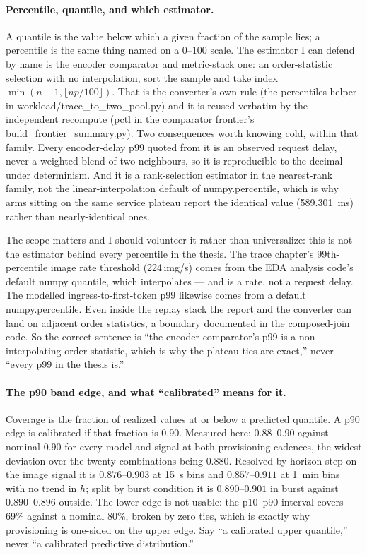 \documentclass[11pt,a4paper]{article}
\def\emph#1{#1}\def\texttt#1{#1}%
\begin{document}
\paragraph{Percentile, quantile, and which estimator.} A quantile is the
value below which a given fraction of the sample lies; a percentile is the
same thing named on a 0--100 scale. The estimator I can defend by name is the
\emph{encoder comparator and metric-stack} one: an \emph{order-statistic
selection with no interpolation}, sort the sample and take index
$\min(n-1, \lfloor n p/100 \rfloor)$. That is the converter's own rule (the
\texttt{percentiles} helper in \texttt{workload/trace\_to\_two\_pool.py}) and
it is reused verbatim by the independent recompute (\texttt{pctl} in the
comparator frontier's \texttt{build\_frontier\_summary.py}). Two consequences
worth knowing cold, \emph{within that family}. Every encoder-delay p99 quoted
from it is an \emph{observed} request delay, never a weighted blend of two
neighbours, so it is reproducible to the decimal under determinism. And it is
a rank-selection estimator in the nearest-rank family, not the
linear-interpolation default of \texttt{numpy.percentile}, which is why arms
sitting on the same service plateau report the \emph{identical} value
(\SI{589.301}{\milli\second}) rather than nearly-identical ones.

The scope matters and I should volunteer it rather than universalize: this is
\emph{not} the estimator behind every percentile in the thesis. The trace
chapter's 99th-percentile image \emph{rate} threshold
(\num{224}\,\si{img/s}) comes from the EDA analysis code's default
\texttt{numpy} quantile, which interpolates --- and is a rate, not a request
delay. The modelled ingress-to-first-token p99 likewise comes from a default
\texttt{numpy.percentile}. Even inside the replay stack the report and the
converter can land on adjacent order statistics, a boundary documented in the
composed-join code. So the correct sentence is ``the encoder comparator's p99
is a non-interpolating order statistic, which is why the plateau ties are
exact,'' never ``every p99 in the thesis is.''

\paragraph{The p90 band edge, and what ``calibrated'' means for it.}
Coverage is the fraction of realized values at or below a predicted
quantile. A p90 edge is calibrated if that fraction is $0.90$. Measured here:
$0.88$--$0.90$ against nominal $0.90$ for every model and signal at both
provisioning cadences, the widest deviation over the twenty combinations
being $0.880$. Resolved by horizon step on the image signal it is
$0.876$--$0.903$ at \SI{15}{\second} bins and $0.857$--$0.911$ at
\SI{1}{\minute} bins with no trend in $h$; split by burst condition it is
$0.890$--$0.901$ in burst against $0.890$--$0.896$ outside. The lower edge is
\emph{not} usable: the p10--p90 interval covers 69\% against a nominal 80\%,
broken by zero ties, which is exactly why provisioning is one-sided on the
upper edge. Say ``a calibrated upper quantile,'' never ``a calibrated
predictive distribution.''
\end{document}
